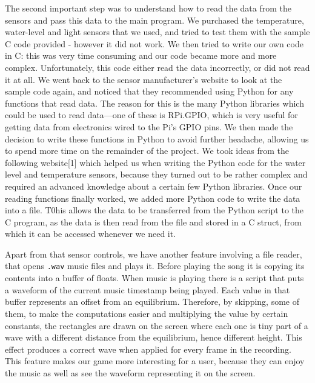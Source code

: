 \documentclass[11pt, oneside, UKenglish]{article}
\begin{document}
The second important step was to understand how to read the data from the sensors and pass this data to the main program.
We purchased the temperature, water-level and light sensors that we used, and tried to test them with the sample C code provided - however it did not work. 
We then tried to write our own code in C: this was very time consuming and our code became more and more complex.
Unfortunately, this code either read the data incorrectly, or did not read it at all.
We went back to the sensor manufacturer's website to look at the sample code again, and noticed that they recommended using Python for any functions that read data.
The reason for this is the many Python libraries which could be used to read data---one of these is RPi.GPIO, which is very useful for getting data from electronics wired to the Pi's GPIO pins.
We then made the decision to write these functions in Python to avoid further headache, allowing us to spend more time on the remainder of the project. We took ideas from the following website[1] which helped us when writing the Python code for the water level and temperature sensors, because they turned out to be rather complex and required an advanced knowledge about a certain few Python libraries. 
Once our reading functions finally worked, we added more Python code to write the data into a file.
T0his allows the data to be transferred from the Python script to the C program, as the data is then read from the file and stored in a C struct, from which it can be accessed whenever we need it. 

Apart from that sensor controls, we have another feature involving a  file reader, that opens \verb|.wav| music files and plays it.
Before playing the song it is copying its contents into a buffer of floats. When music is playing there is a script that puts a waveform of the current music timestamp being played.
Each value in that buffer represents an offset from an equilibrium.
Therefore, by skipping, some of them, to make the computations easier and multiplying the value by certain constants, the rectangles are drawn on the screen where each one is tiny part of a wave with a different distance from the equilibrium, hence different height.
This effect produces a correct wave when applied for every frame in the recording.
This feature makes our game more interesting for a user, because they can enjoy the music as well as see the waveform representing it on the screen.
\end{document}
